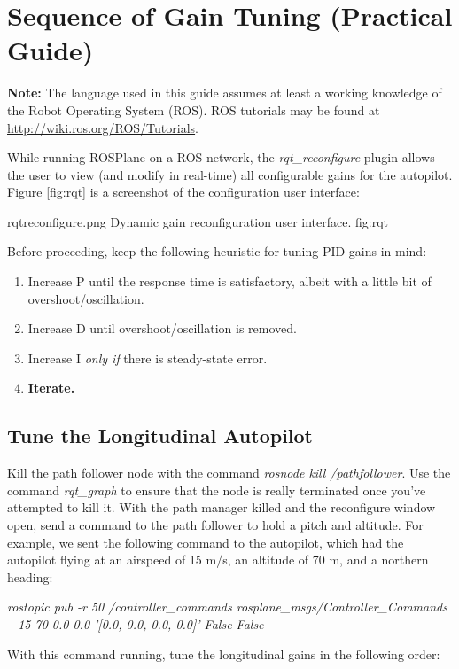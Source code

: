 \documentclass[]{auvsi_doc}
\begin{document}
\section{Sequence of Gain Tuning (Practical Guide)}

\textbf{Note:} The language used in this guide assumes at least a working knowledge of the Robot Operating System (ROS). ROS tutorials may be found at \url{http://wiki.ros.org/ROS/Tutorials}.

While running ROSPlane on a ROS network, the \textit{rqt\_reconfigure} plugin allows the user to view (and modify in real-time) all configurable gains for the autopilot. Figure \ref{fig:rqt} is a screenshot of the configuration user interface:

\AUVSIFigure
{{rqtreconfigure.png}}
{\textwidth}
{Dynamic gain reconfiguration user interface.}
{fig:rqt}

Before proceeding, keep the following heuristic for tuning PID gains in mind:
\begin{enumerate}
  \item Increase P until the response time is satisfactory, albeit with a little bit of overshoot/oscillation.
	\item Increase D until overshoot/oscillation is removed.
	\item Increase I \textit{only if} there is steady-state error.
	\item \textbf{Iterate.}
\end{enumerate}

\subsection{Tune the Longitudinal Autopilot}

Kill the path follower node with the command \textit{rosnode kill /pathfollower}. Use the command \textit{rqt\_graph} to ensure that the node is really terminated once you've attempted to kill it. With the path manager killed and the reconfigure window open, send a command to the path follower to hold a pitch and altitude. For example, we sent the following command to the autopilot, which had the autopilot flying at an airspeed of 15 m/s, an altitude of 70 m, and a northern heading:

\textit{rostopic pub -r 50 /controller\_commands rosplane\_msgs/Controller\_Commands -- 15 70 0.0  0.0 '[0.0, 0.0, 0.0, 0.0]' False False}

With this command running, tune the longitudinal gains in the following order:
\end{document}

